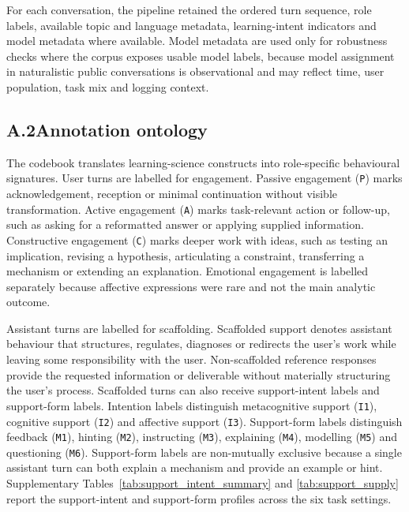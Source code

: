 

\clearpage



\clearpage



For each conversation, the pipeline retained the ordered turn sequence, role labels, available topic and language metadata, learning-intent indicators and model metadata where available. Model metadata are used only for robustness checks where the corpus exposes usable model labels, because model assignment in naturalistic public conversations is observational and may reflect time, user population, task mix and logging context.

\subsection*{A.2\quad Annotation ontology}

The codebook translates learning-science constructs into role-specific behavioural signatures. User turns are labelled for engagement. Passive engagement (\texttt{P}) marks acknowledgement, reception or minimal continuation without visible transformation. Active engagement (\texttt{A}) marks task-relevant action or follow-up, such as asking for a reformatted answer or applying supplied information. Constructive engagement (\texttt{C}) marks deeper work with ideas, such as testing an implication, revising a hypothesis, articulating a constraint, transferring a mechanism or extending an explanation. Emotional engagement is labelled separately because affective expressions were rare and not the main analytic outcome.

Assistant turns are labelled for scaffolding. Scaffolded support denotes assistant behaviour that structures, regulates, diagnoses or redirects the user's work while leaving some responsibility with the user. Non-scaffolded reference responses provide the requested information or deliverable without materially structuring the user's process. Scaffolded turns can also receive support-intent labels and support-form labels. Intention labels distinguish metacognitive support (\texttt{I1}), cognitive support (\texttt{I2}) and affective support (\texttt{I3}). Support-form labels distinguish feedback (\texttt{M1}), hinting (\texttt{M2}), instructing (\texttt{M3}), explaining (\texttt{M4}), modelling (\texttt{M5}) and questioning (\texttt{M6}). Support-form labels are non-mutually exclusive because a single assistant turn can both explain a mechanism and provide an example or hint. Supplementary Tables~\ref{tab:support_intent_summary} and \ref{tab:support_supply} report the support-intent and support-form profiles across the six task settings.

